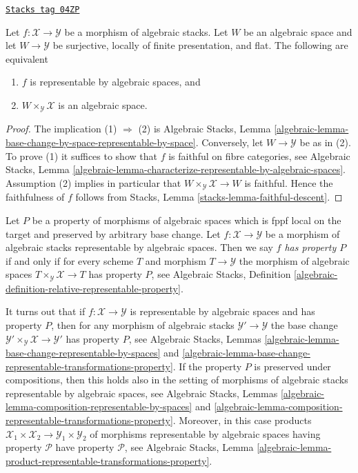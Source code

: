 \begin{lemma}
\label{stacks-properties-lemma-check-representable-covering}
\href{https://stacks.math.columbia.edu/tag/04ZP}{\texttt{Stacks tag 04ZP}}

Let $f : \mathcal{X} \to \mathcal{Y}$ be a morphism of algebraic stacks.
Let $W$ be an algebraic space and let $W \to \mathcal{Y}$ be surjective,
locally of finite presentation, and flat. The following are equivalent
\begin{enumerate}
\item $f$ is representable by algebraic spaces, and
\item $W \times_\mathcal{Y} \mathcal{X}$ is an algebraic space.
\end{enumerate}
\end{lemma}

\begin{proof}
The implication (1) $\Rightarrow$ (2) is
Algebraic Stacks,
Lemma \ref{algebraic-lemma-base-change-by-space-representable-by-space}.
Conversely, let $W \to \mathcal{Y}$ be as in (2). To prove (1) it
suffices to show that $f$ is faithful on fibre categories, see
Algebraic Stacks,
Lemma \ref{algebraic-lemma-characterize-representable-by-algebraic-spaces}.
Assumption (2) implies in particular that
$W \times_\mathcal{Y} \mathcal{X} \to W$ is faithful.
Hence the faithfulness of $f$ follows from
Stacks, Lemma \ref{stacks-lemma-faithful-descent}.
\end{proof}

Let $P$ be a property of morphisms of algebraic spaces which is
fppf local on the target and preserved by arbitrary base change.
Let $f : \mathcal{X} \to \mathcal{Y}$ be a morphism of algebraic stacks
representable by algebraic spaces. Then we say
{\it $f$ has property $P$} if and only if for every scheme $T$
and morphism $T \to \mathcal{Y}$ the morphism of algebraic spaces
$T \times_\mathcal{Y} \mathcal{X} \to T$ has property $P$, see
Algebraic Stacks,
Definition \ref{algebraic-definition-relative-representable-property}.

\medskip\noindent
It turns out that if $f : \mathcal{X} \to \mathcal{Y}$ is representable
by algebraic spaces and has property $P$, then for any morphism of algebraic
stacks $\mathcal{Y}' \to \mathcal{Y}$ the base change
$\mathcal{Y}' \times_\mathcal{Y} \mathcal{X} \to \mathcal{Y}'$
has property $P$, see
Algebraic Stacks,
Lemmas \ref{algebraic-lemma-base-change-representable-by-spaces} and
\ref{algebraic-lemma-base-change-representable-transformations-property}.
If the property $P$ is preserved under compositions, then this holds
also in the setting of morphisms of algebraic stacks representable by
algebraic spaces, see
Algebraic Stacks,
Lemmas \ref{algebraic-lemma-composition-representable-by-spaces} and
\ref{algebraic-lemma-composition-representable-transformations-property}.
Moreover, in this case products
$\mathcal{X}_1 \times \mathcal{X}_2 \to \mathcal{Y}_1 \times \mathcal{Y}_2$
of morphisms representable by algebraic spaces having property $\mathcal{P}$
have property $\mathcal{P}$, see
Algebraic Stacks, Lemma
\ref{algebraic-lemma-product-representable-transformations-property}.


